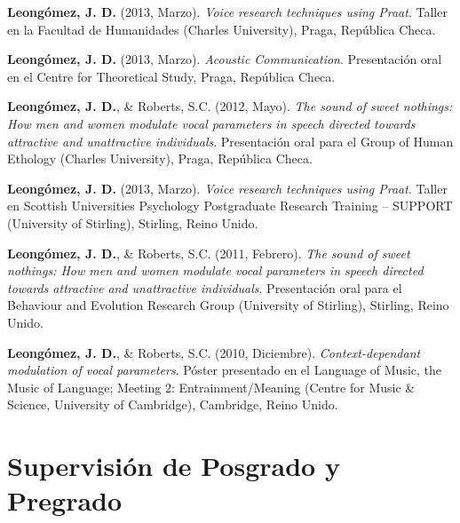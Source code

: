 \documentclass[11pt, a4paper]{awesome-cv}
\begin{document}
\textbf{Leongómez, J. D.} (2013, Marzo). \emph{Voice research techniques
using Praat}. Taller en la Facultad de Humanidades (Charles University),
Praga, República Checa.

\textbf{Leongómez, J. D.} (2013, Marzo). \emph{Acoustic Communication}.
Presentación oral en el Centre for Theoretical Study, Praga, República
Checa.

\textbf{Leongómez, J. D.}, \& Roberts, S.C. (2012, Mayo). \emph{The
sound of sweet nothings: How men and women modulate vocal parameters in
speech directed towards attractive and unattractive individuals}.
Presentación oral para el Group of Human Ethology (Charles University),
Praga, República Checa.

\textbf{Leongómez, J. D.} (2013, Marzo). \emph{Voice research techniques
using Praat}. Taller en Scottish Universities Psychology Postgraduate
Research Training -- SUPPORT (University of Stirling), Stirling, Reino
Unido.

\textbf{Leongómez, J. D.}, \& Roberts, S.C. (2011, Febrero). \emph{The
sound of sweet nothings: How men and women modulate vocal parameters in
speech directed towards attractive and unattractive individuals}.
Presentación oral para el Behaviour and Evolution Research Group
(University of Stirling), Stirling, Reino Unido.

\textbf{Leongómez, J. D.}, \& Roberts, S.C. (2010, Diciembre).
\emph{Context-dependant modulation of vocal parameters}. Póster
presentado en el Language of Music, the Music of Language; Meeting 2:
Entrainment/Meaning (Centre for Music \& Science, University of
Cambridge), Cambridge, Reino Unido.

\endgroup

\hypertarget{supervisiuxf3n-de-posgrado-y-pregrado}{%
\section{Supervisión de Posgrado y
Pregrado}\label{supervisiuxf3n-de-posgrado-y-pregrado}}
\end{document}
